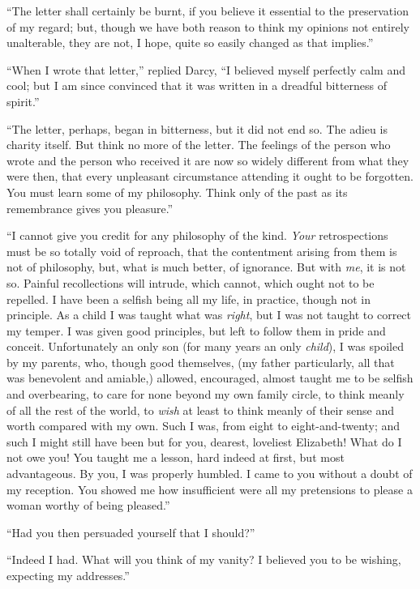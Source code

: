 \documentclass[12pt,openright]{book}
\begin{document}
“The letter shall certainly be burnt, if you believe it essential to the preservation of my regard; but, though we have both reason to think my opinions not entirely unalterable, they are not, I hope, quite so easily changed as that implies.”

“When I wrote that letter,” replied Darcy, “I believed myself perfectly calm and cool; but I am since convinced that it was written in a dreadful bitterness of spirit.”

“The letter, perhaps, began in bitterness, but it did not end so. The adieu is charity itself. But think no more of the letter. The feelings of the person who wrote and the person who received it are now so widely different from what they were then, that every unpleasant circumstance attending it ought to be forgotten. You must learn some of my philosophy. Think only of the past as its remembrance gives you pleasure.”

“I cannot give you credit for any philosophy of the kind. \textit{Your} retrospections must be so totally void of reproach, that the contentment arising from them is not of philosophy, but, what is much better, of ignorance. But with \textit{me}, it is not so. Painful recollections will intrude, which cannot, which ought not to be repelled. I have been a selfish being all my life, in practice, though not in principle. As a child I was taught what was \textit{right}, but I was not taught to correct my temper. I was given good principles, but left to follow them in pride and conceit. Unfortunately an only son (for many years an only \textit{child}), I was spoiled by my parents, who, though good themselves, (my father particularly, all that was benevolent and amiable,) allowed, encouraged, almost taught me to be selfish and overbearing, to care for none beyond my own family circle, to think meanly of all the rest of the world, to \textit{wish} at least to think meanly of their sense and worth compared with my own. Such I was, from eight to eight-and-twenty; and such I might still have been but for you, dearest, loveliest Elizabeth! What do I not owe you! You taught me a lesson, hard indeed at first, but most advantageous. By you, I was properly humbled. I came to you without a doubt of my reception. You showed me how insufficient were all my pretensions to please a woman worthy of being pleased.”

“Had you then persuaded yourself that I should?”

“Indeed I had. What will you think of my vanity? I believed you to be wishing, expecting my addresses.”
\end{document}
